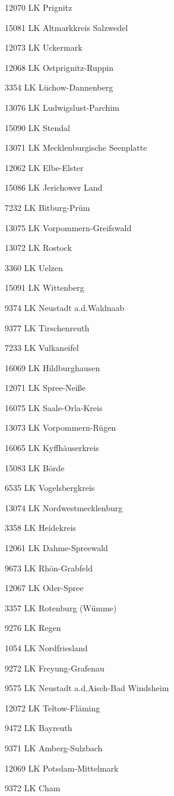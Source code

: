 12070  LK Prignitz

15081  LK Altmarkkreis Salzwedel

12073  LK Uckermark

12068  LK Ostprignitz-Ruppin

3354  LK Lüchow-Dannenberg

13076  LK Ludwigslust-Parchim

15090  LK Stendal

13071  LK Mecklenburgische Seenplatte

12062  LK Elbe-Elster

15086  LK Jerichower Land

7232  LK Bitburg-Prüm

13075  LK Vorpommern-Greifswald

13072  LK Rostock

3360  LK Uelzen

15091  LK Wittenberg

9374  LK Neustadt a.d.Waldnaab

9377  LK Tirschenreuth

7233  LK Vulkaneifel

16069  LK Hildburghausen

12071  LK Spree-Neiße

16075  LK Saale-Orla-Kreis

13073  LK Vorpommern-Rügen

16065  LK Kyffhäuserkreis

15083  LK Börde

6535  LK Vogelsbergkreis

13074  LK Nordwestmecklenburg

3358  LK Heidekreis

12061  LK Dahme-Spreewald

9673  LK Rhön-Grabfeld

12067  LK Oder-Spree

3357  LK Rotenburg (Wümme)

9276  LK Regen

1054  LK Nordfriesland

9272  LK Freyung-Grafenau

9575  LK Neustadt a.d.Aisch-Bad Windsheim

12072  LK Teltow-Fläming

9472  LK Bayreuth

9371  LK Amberg-Sulzbach

12069  LK Potsdam-Mittelmark

9372  LK Cham

